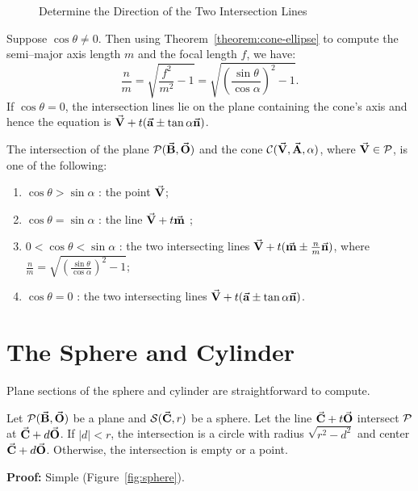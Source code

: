 \begin{figure}
\vspace{4cm}
\caption{Determine the Direction of the Two Intersection Lines}
\label{fig:vtx-on-plane}
\end{figure}

     Suppose $\cos\theta\neq 0$.  Then using Theorem~\ref{theorem:cone-ellipse}
to compute the semi--major axis length
$m$ and the focal length $f$, we have:
\[   \frac{n}{m} = \sqrt{\frac{f^2}{m^2}-1}=
     \sqrt{\left(\frac{\sin\theta}{\cos\alpha}\right)^2-1}.  \]
If $\cos\theta=0$, the intersection lines lie on the plane
containing the cone's axis and hence the equation is
$\vec{\bf V}+t(\vec{\bf a}\pm\tan\alpha\vec{\bf n})$.

\begin{theorem}
\label{theorem:cone-line}
The intersection of the plane ${\cal P}(\vec{\bf B},\vec{\bf O})$ and the cone
${\cal C}(\vec{\bf V},\vec{\bf A},\alpha)$, where $\vec{\bf V}\in{\cal P}$,
is one of the following:
\begin{enumerate}
     \item $\cos\theta>\sin\alpha$ : the point $\vec{\bf V}$;
     \item $\cos\theta=\sin\alpha$ : the line $\vec{\bf V}+t\vec{\bf m}$ ;
     \item $0<\cos\theta<\sin\alpha$ : the two intersecting lines 
          $\vec{\bf V}+t(\vec{\bf m}\pm\frac{n}{m}\vec{\bf n})$,
  where $\frac{n}{m} = \sqrt{\left(\frac{\sin\theta}{\cos\alpha}\right)^2-1}$;
     \item $\cos\theta=0$ : the two intersecting lines 
          $\vec{\bf V}+t(\vec{\bf a}\pm\tan\alpha\vec{\bf n})$.
\end{enumerate}
\end{theorem}
     


\section{The Sphere and Cylinder}
\label{section:simple}

Plane sections of the sphere and cylinder are straightforward to compute.

\begin{lemma}
\label{lemma:sphere}
     Let ${\cal P}(\vec{\bf B},\vec{\bf O})$ be a plane and 
${\cal S}(\vec{\bf C},r)$ be a sphere.  Let the line $\vec{\bf C}+t\vec{\bf O}$
intersect ${\cal P}$ at $\vec{\bf C}+d\vec{\bf O}$.
If $|d| < r$, the intersection is a circle with radius $\sqrt{r^2-d^2}$ 
and center $\vec{\bf C}+d\vec{\bf O}$.
Otherwise, the intersection is empty or a point.
\end{lemma}
{\bf Proof:} Simple (Figure~\ref{fig:sphere}). \QED


